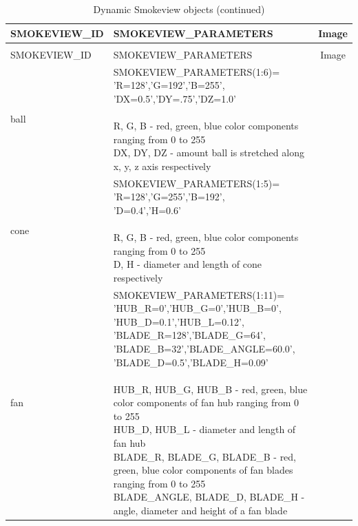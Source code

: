 \begin{longtable}[ht]{|l|l|c|}
\caption{Dynamic Smokeview objects}
\label{tab:devices_dynamic}
\\ \hline
{\ct SMOKEVIEW\_ID}  & {\ct SMOKEVIEW\_PARAMETERS} & Image  \\ \hline \hline
\endfirsthead
\caption{Dynamic Smokeview objects (continued)}
\\ \hline
{\ct SMOKEVIEW\_ID}  & {\ct SMOKEVIEW\_PARAMETERS} & Image  \\ \hline \hline
\endhead

{\ct ball} &
\parbox[c]{\boxwidth}{
{\ct SMOKEVIEW\_PARAMETERS(1:6)=}\\
{\ct 'R=128','G=192','B=255',}\\
{\ct 'DX=0.5','DY=.75','DZ=1.0'}\\  \\
R, G, B - red, green, blue color components ranging from 0 to 255\\
DX, DY, DZ - amount ball is stretched along x, y, z axis respectively
} &
 \\ \hline

{\ct cone} &
\parbox[c]{\boxwidth}{
{\ct SMOKEVIEW\_PARAMETERS(1:5)=}\\
{\ct 'R=128','G=255','B=192',}\\
{\ct 'D=0.4','H=0.6'}\\ \\
R, G, B - red, green, blue color components ranging from 0 to 255\\
D, H - diameter and length of cone respectively
} &
 \\ \hline

{\ct fan} &
\parbox[c]{\boxwidth}{
{\ct SMOKEVIEW\_PARAMETERS(1:11)=}\\
{\ct 'HUB\_R=0','HUB\_G=0','HUB\_B=0',}\\
{\ct 'HUB\_D=0.1','HUB\_L=0.12',}\\
{\ct 'BLADE\_R=128','BLADE\_G=64',}\\
{\ct 'BLADE\_B=32','BLADE\_ANGLE=60.0',}\\
{\ct 'BLADE\_D=0.5','BLADE\_H=0.09'}\\  \\
HUB\_R, HUB\_G, HUB\_B - red, green, blue color components of fan hub ranging from 0 to 255\\
HUB\_D, HUB\_L - diameter and length of fan hub\\
BLADE\_R, BLADE\_G, BLADE\_B - red, green, blue color components of fan blades ranging from 0 to 255\\
BLADE\_ANGLE, BLADE\_D, BLADE\_H - angle, diameter and height of a fan blade
} &
 \\ \hline


\end{longtable}
